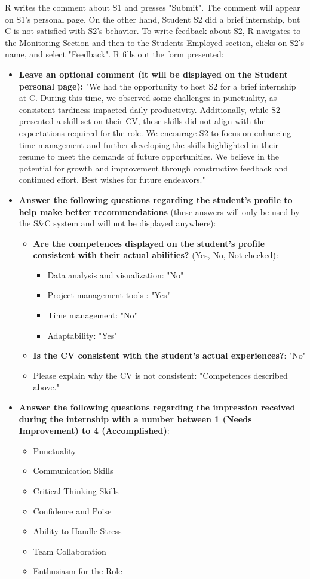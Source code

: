 R writes the comment about S1 and presses "Submit". The comment will appear on S1's personal page.
On the other hand, Student S2 did a brief internship, but C is not satisfied with S2's behavior. To write feedback about S2, R navigates to the Monitoring Section and then to the Students Employed section, clicks on S2's name, and select "Feedback".  R fills out the form presented:
\begin{itemize}
    \item \textbf{Leave an optional comment (it will be displayed on the Student personal page):} "We had the opportunity to host S2 for a brief internship at C. During this time, we observed some challenges in punctuality, as consistent tardiness impacted daily productivity. Additionally, while S2 presented a skill set on their CV, these skills did not align with the expectations required for the role. We encourage S2 to focus on enhancing time management and further developing the skills highlighted in their resume to meet the demands of future opportunities. We believe in the potential for growth and improvement through constructive feedback and continued effort. Best wishes for future endeavors."
    \item \textbf{Answer the following questions regarding the student's profile to help make better recommendations} (these answers will only be used by the S\&C system and will not be displayed anywhere):
    \begin{itemize}
        \item \textbf{Are the competences displayed on the student's profile consistent with their actual abilities?} (Yes, No, Not checked):
        \begin{itemize}
            \item Data analysis and visualization: "No"
            \item Project management tools : "Yes"
            \item Time management: "No"
            \item Adaptability: "Yes"
        \end{itemize}
        \item \textbf{Is the CV consistent with the student's actual experiences?}: "No"
        \item Please explain why the CV is not consistent: "Competences described above."
    \end{itemize}
    \item\textbf{Answer the following questions regarding the impression received during the internship with a number between 1 (Needs Improvement) to 4 (Accomplished)}:
    \begin{itemize}
        \item Punctuality 
        \item Communication Skills
        \item Critical Thinking Skills
        \item Confidence and Poise
        \item Ability to Handle Stress
        \item Team Collaboration 
        \item Enthusiasm for the Role
    \end{itemize}
\end{itemize}
